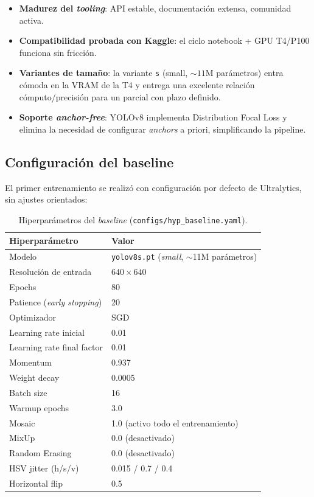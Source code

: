\documentclass[11pt,a4paper]{article}
\begin{document}
\begin{itemize}[leftmargin=*]
    \item \textbf{Madurez del \textit{tooling}}: API estable,
    documentación extensa, comunidad activa.
    \item \textbf{Compatibilidad probada con Kaggle}: el ciclo
    notebook + GPU T4/P100 funciona sin fricción.
    \item \textbf{Variantes de tamaño}: la variante \texttt{s} (small,
    $\sim 11$M parámetros) entra cómoda en la VRAM de la T4 y entrega
    una excelente relación cómputo/precisión para un parcial con plazo
    definido.
    \item \textbf{Soporte \textit{anchor-free}}: YOLOv8 implementa
    Distribution Focal Loss y elimina la necesidad de configurar
    \textit{anchors} a priori, simplificando la pipeline.
\end{itemize}

\subsection{Configuración del baseline}

El primer entrenamiento se realizó con configuración por defecto de
Ultralytics, sin ajustes orientados:

\begin{table}[H]
\centering
\caption{Hiperparámetros del \textit{baseline} (\texttt{configs/hyp\_baseline.yaml}).}
\begin{tabular}{l l}
\toprule
\textbf{Hiperparámetro} & \textbf{Valor} \\
\midrule
Modelo & \texttt{yolov8s.pt} (\textit{small}, $\sim$11M parámetros) \\
Resolución de entrada & $640 \times 640$ \\
Epochs & 80 \\
Patience (\textit{early stopping}) & 20 \\
Optimizador & SGD \\
Learning rate inicial & 0.01 \\
Learning rate final factor & 0.01 \\
Momentum & 0.937 \\
Weight decay & 0.0005 \\
Batch size & 16 \\
Warmup epochs & 3.0 \\
Mosaic & 1.0 (activo todo el entrenamiento) \\
MixUp & 0.0 (desactivado) \\
Random Erasing & 0.0 (desactivado) \\
HSV jitter (h/s/v) & 0.015 / 0.7 / 0.4 \\
Horizontal flip & 0.5 \\
\bottomrule
\end{tabular}
\end{table}
\end{document}

